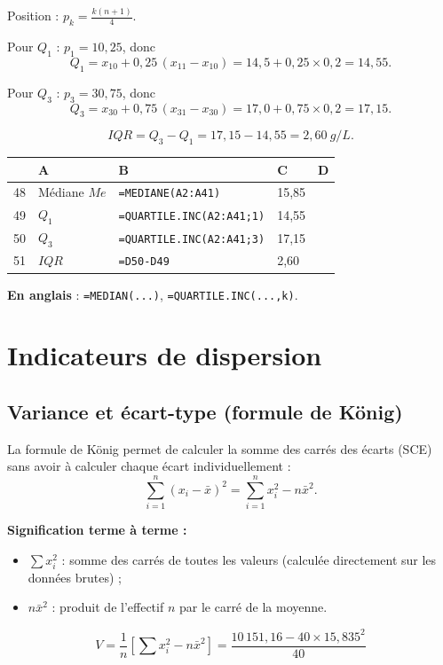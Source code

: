 \documentclass[11pt,a4paper]{article}
\newenvironment{calcsheet}[1][\footnotesize]
  {\begin{center}#1
   \begin{tabular}{|>{\columncolor{calchead}}c|l|l|l|l|}
   \hline
   \rowcolor{calchead}
   & \textbf{A} & \textbf{B} & \textbf{C} & \textbf{D} \\ \hline}
  {\end{tabular}\end{center}}
\newcommand{\fc}[1]{\textcolor{calcform}{\texttt{#1}}}
\begin{document}
Position : \( p_k = \frac{k(n+1)}{4} \).

\medskip
\noindent Pour \( Q_1 \) : \( p_1 = 10{,}25 \), donc
\[
Q_1 = x_{10} + 0{,}25\,(x_{11}-x_{10}) = 14{,}5 + 0{,}25 \times 0{,}2
= \boxed{14{,}55}.
\]

\noindent Pour \( Q_3 \) : \( p_3 = 30{,}75 \), donc
\[
Q_3 = x_{30} + 0{,}75\,(x_{31}-x_{30}) = 17{,}0 + 0{,}75 \times 0{,}2
= \boxed{17{,}15}.
\]

\[
IQR = Q_3 - Q_1 = 17{,}15 - 14{,}55 = \boxed{2{,}60\ \si{g/L}}.
\]

\begin{calcsheet}
48 & Médiane \( Me \) & \fc{=MEDIANE(A2:A41)} & 15,85 & \\ \hline
49 & \( Q_1 \) & \fc{=QUARTILE.INC(A2:A41;1)} & 14,55 & \\ \hline
50 & \( Q_3 \) & \fc{=QUARTILE.INC(A2:A41;3)} & 17,15 & \\ \hline
51 & \( IQR \) & \fc{=D50-D49} & 2,60 & \\ \hline
\end{calcsheet}

\noindent\textbf{En anglais} : \fc{=MEDIAN(...)}, \fc{=QUARTILE.INC(...,k)}.

\section{Indicateurs de dispersion}

\subsection{Variance et écart-type (formule de König)}

La formule de König permet de calculer la somme des carrés des
écarts (SCE) sans avoir à calculer chaque écart individuellement :
\[
\sum_{i=1}^{n}(x_i-\bar{x})^2 = \sum_{i=1}^{n} x_i^2 - n\bar{x}^2.
\]

\noindent\textbf{Signification terme à terme :}
\begin{itemize}
  \item \( \sum x_i^2 \) : somme des carrés de toutes les valeurs
        (calculée directement sur les données brutes) ;
  \item \( n\bar{x}^2 \) : produit de l'effectif \( n \) par le carré
        de la moyenne.
\end{itemize}

\[
V = \frac{1}{n}\left[\sum x_i^2 - n\bar{x}^2\right]
= \frac{10\,151{,}16 - 40\times 15{,}835^2}{40}
\]
\end{document}
